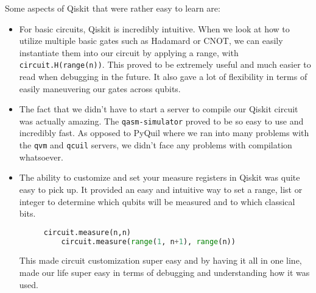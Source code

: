 \documentclass[12pt]{article}
\begin{document}
Some aspects of Qiskit that were rather easy to learn are:
\begin{itemize}
    \item For basic circuits, Qiskit is incredibly intuitive. When we look at how to utilize multiple basic gates such as Hadamard or CNOT, we can easily instantiate them into our circuit by applying a range, with \texttt{circuit.H(range(n))}.
This proved to be extremely useful and much easier to read when debugging in the future. It also gave a lot of flexibility in terms of easily maneuvering our gates across qubits.
\item The fact that we didn’t have to start a server to compile our Qiskit circuit was actually amazing. The \texttt{qasm-simulator} proved to be so easy to use and incredibly fast. As opposed to PyQuil where we ran into many problems with the \texttt{qvm} and \texttt{qcuil} servers, we didn’t face any problems with compilation whatsoever.
\item The ability to customize and set your measure registers in Qiskit was quite easy to pick up. It provided an easy and intuitive way to set a range, list or integer to determine which qubits will be measured and to which classical bits.

\begin{figure}[h]
    \centering
    \begin{lstlisting}[numbers=none, language=Python]
    circuit.measure(n,n)
    circuit.measure(range(1, n+1), range(n))
\end{lstlisting}
\end{figure}
This made circuit customization super easy and by having it all in one line, made our life super easy in terms of debugging and understanding how it was used.
\end{itemize}
\end{document}
